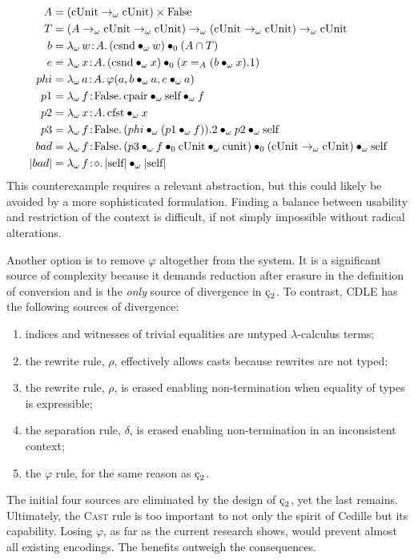 \begin{align*}
    A &= (\pUnit \to_\omega \pUnit) \times \pFalse \\
    T &= (A \to_\omega \pUnit \to_\omega \pUnit) \to_\omega (\pUnit \to_\omega \pUnit) \to_\omega \pUnit \\
    b &= \abs{\lambda_\omega}{w}{A}{
        \app{(\app{\psnd}{\omega}{w})}{0}{(A \cap T)}
    } \\
    e &= \abs{\lambda_\omega}{x}{A}{
        \app{(\app{\psnd}{\omega}{x})}{0}{(x =_A (\app{b}{\omega}{x}).1)}
    } \\
    phi &= \abs{\lambda_\omega}{a}{A}{\varphi(a, \app{b}{\omega}{a}, \app{e}{\omega}{a})} \\
    p1 &= \abs{\lambda_\omega}{f}{\pFalse}{\apptwo{\ppair}{\omega}{\pself}{\omega}{f}} \\
    p2 &= \abs{\lambda_\omega}{x}{A}{\app{\pfst}{\omega}{x}} \\
    p3 &= \abs{\lambda_\omega}{f}{\pFalse}{
        \apptwo{(\app{phi}{\omega}{(\app{p1}{\omega}{f})}).2}
            {\omega}{p2}
            {\omega}{\pself}
    } \\
    bad &= \abs{\lambda_\omega}{f}{\pFalse}{
        \apptwo{(\appthr{p3}{\omega}{f}{0}{\pUnit}{\omega}{\punit})}
            {0}{(\pUnit \to_\omega \pUnit)}
            {\omega}{\pself}
    } \\
    |bad| &= \abs{\lambda_\omega}{f}{\diamond}{\app{|\pself|}{\omega}{|\pself|}}
\end{align*}
This counterexample requires a relevant abstraction, but this could likely be avoided by a more sophisticated formulation.
Finding a balance between usability and restriction of the context is difficult, if not simply impossible without radical alterations.

Another option is to remove $\varphi$ altogether from the system.
It is a significant source of complexity because it demands reduction after erasure in the definition of conversion and is the \textit{only} source of divergence in $\ced$.
To contrast, CDLE has the following sources of divergence:
\begin{enumerate}
    \item indices and witnesses of trivial equalities are untyped $\lambda$-calculus terms;
    \item the rewrite rule, $\rho$, effectively allows casts because rewrites are not typed;
    \item the rewrite rule, $\rho$, is erased enabling non-termination when equality of types is expressible;
    \item the separation rule, $\delta$, is erased enabling non-termination in an inconsistent context;
    \item the $\varphi$ rule, for the same reason as $\ced$.
\end{enumerate}
The initial four sources are eliminated by the design of $\ced$, yet the last remains.
Ultimately, the \textsc{Cast} rule is too important to not only the spirit of Cedille but its capability.
Losing $\varphi$, as far as the current research shows, would prevent almost all existing encodings.
The benefits outweigh the consequences.
